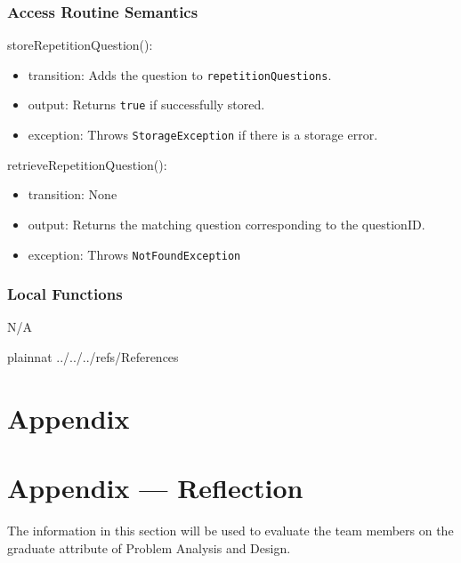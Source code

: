 \documentclass[12pt, titlepage]{article}
\begin{document}
\subsubsection{Access Routine Semantics}

\noindent storeRepetitionQuestion():
\begin{itemize}
  \item transition: Adds the question to \texttt{repetitionQuestions}.
  \item output: Returns \texttt{true} if successfully stored.
  \item exception: Throws \texttt{StorageException} if there is a storage error.
\end{itemize}

\noindent retrieveRepetitionQuestion():
\begin{itemize}
  \item transition: None
  \item output: Returns the matching question corresponding to the questionID.
  \item exception: Throws \texttt{NotFoundException}
\end{itemize}

\subsubsection{Local Functions}

N/A

\newpage

 {plainnat}
 {../../../refs/References}

\newpage

\section{Appendix} \label{Appendix}


\newpage{}

\section*{Appendix --- Reflection}


The information in this section will be used to evaluate the team members on the
graduate attribute of Problem Analysis and Design.


\end{document}
